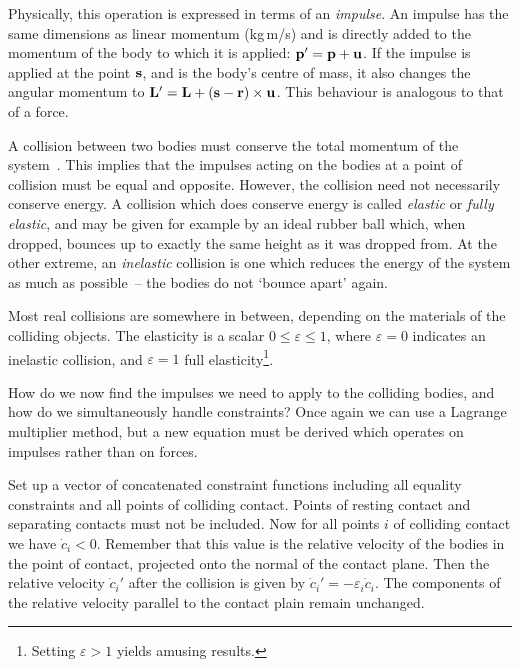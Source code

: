 Physically, this operation is expressed in terms of an \emph{impulse}. An impulse  has the
same dimensions as linear momentum  (kg\,m/s) and is directly added to the momentum of the
body to which it is applied: $\ve{p}' = \ve{p} + \ve{u}$. If the impulse is applied at the point
$\ve{s}$, and  is the body's centre of mass, it also changes the angular momentum to
$\ve{L}' = \ve{L} + (\ve{s} - \ve{r})\times\ve{u}$. This behaviour is analogous to that of a
force.

A collision between two bodies must conserve the total momentum of the system~\cite{Feynman:63}.
This implies that the impulses acting on the bodies at a point of collision must be equal and
opposite. However, the collision need not necessarily conserve energy. A collision which does
conserve energy is called \emph{elastic} or \emph{fully elastic}, and may be given for example
by an ideal rubber ball which, when dropped, bounces up to exactly the same height as it was
dropped from. At the other extreme, an \emph{inelastic} collision is one which reduces the energy
of the system as much as possible~-- the bodies do not `bounce apart' again.

Most real collisions are somewhere in between, depending on the materials of the colliding
objects. The elasticity is a scalar $0 \le \varepsilon \le 1$, where $\varepsilon = 0$ indicates
an inelastic collision, and $\varepsilon = 1$ full elasticity\footnote{Setting $\varepsilon > 1$
yields amusing results.}.

How do we now find the impulses we need to apply to the colliding bodies, and how do we
simultaneously handle constraints? Once again we can use a Lagrange multiplier method, but a new
equation must be derived which operates on impulses rather than on forces.

Set up a vector  of concatenated constraint functions including all equality constraints
and all points of colliding contact. Points of resting contact and separating contacts must
not be included. Now for all points $i$ of colliding contact we have $\dot{c}_i < 0$.
Remember that this value is the relative velocity of the bodies in the point of contact,
projected onto the normal of the contact plane. Then the relative velocity $\dot{c}_i'$ after
the collision is given by $\dot{c}_i' = -\varepsilon_i \dot{c}_i$. The components of the relative
velocity parallel to the contact plain remain unchanged.

